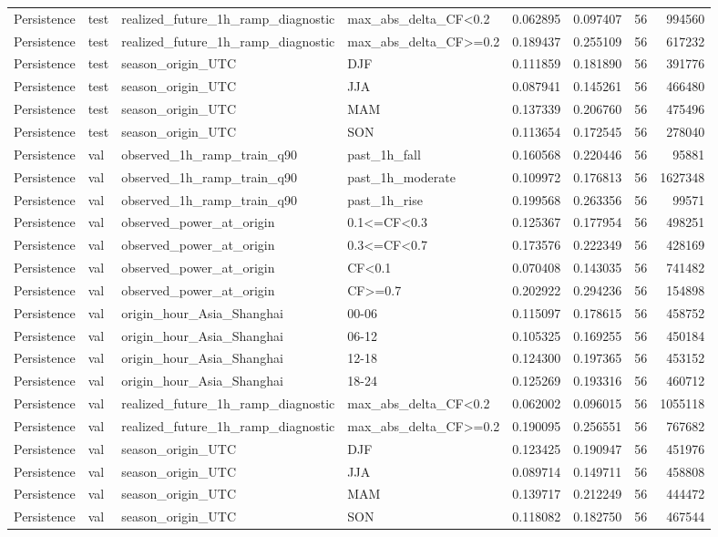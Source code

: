 \begin{tabular}{llllrrrr}
Persistence & test & realized\_future\_1h\_ramp\_diagnostic & max\_abs\_delta\_CF<0.2 & 0.062895 & 0.097407 & 56 & 994560 \\
Persistence & test & realized\_future\_1h\_ramp\_diagnostic & max\_abs\_delta\_CF>=0.2 & 0.189437 & 0.255109 & 56 & 617232 \\
Persistence & test & season\_origin\_UTC & DJF & 0.111859 & 0.181890 & 56 & 391776 \\
Persistence & test & season\_origin\_UTC & JJA & 0.087941 & 0.145261 & 56 & 466480 \\
Persistence & test & season\_origin\_UTC & MAM & 0.137339 & 0.206760 & 56 & 475496 \\
Persistence & test & season\_origin\_UTC & SON & 0.113654 & 0.172545 & 56 & 278040 \\
Persistence & val & observed\_1h\_ramp\_train\_q90 & past\_1h\_fall & 0.160568 & 0.220446 & 56 & 95881 \\
Persistence & val & observed\_1h\_ramp\_train\_q90 & past\_1h\_moderate & 0.109972 & 0.176813 & 56 & 1627348 \\
Persistence & val & observed\_1h\_ramp\_train\_q90 & past\_1h\_rise & 0.199568 & 0.263356 & 56 & 99571 \\
Persistence & val & observed\_power\_at\_origin & 0.1<=CF<0.3 & 0.125367 & 0.177954 & 56 & 498251 \\
Persistence & val & observed\_power\_at\_origin & 0.3<=CF<0.7 & 0.173576 & 0.222349 & 56 & 428169 \\
Persistence & val & observed\_power\_at\_origin & CF<0.1 & 0.070408 & 0.143035 & 56 & 741482 \\
Persistence & val & observed\_power\_at\_origin & CF>=0.7 & 0.202922 & 0.294236 & 56 & 154898 \\
Persistence & val & origin\_hour\_Asia\_Shanghai & 00-06 & 0.115097 & 0.178615 & 56 & 458752 \\
Persistence & val & origin\_hour\_Asia\_Shanghai & 06-12 & 0.105325 & 0.169255 & 56 & 450184 \\
Persistence & val & origin\_hour\_Asia\_Shanghai & 12-18 & 0.124300 & 0.197365 & 56 & 453152 \\
Persistence & val & origin\_hour\_Asia\_Shanghai & 18-24 & 0.125269 & 0.193316 & 56 & 460712 \\
Persistence & val & realized\_future\_1h\_ramp\_diagnostic & max\_abs\_delta\_CF<0.2 & 0.062002 & 0.096015 & 56 & 1055118 \\
Persistence & val & realized\_future\_1h\_ramp\_diagnostic & max\_abs\_delta\_CF>=0.2 & 0.190095 & 0.256551 & 56 & 767682 \\
Persistence & val & season\_origin\_UTC & DJF & 0.123425 & 0.190947 & 56 & 451976 \\
Persistence & val & season\_origin\_UTC & JJA & 0.089714 & 0.149711 & 56 & 458808 \\
Persistence & val & season\_origin\_UTC & MAM & 0.139717 & 0.212249 & 56 & 444472 \\
Persistence & val & season\_origin\_UTC & SON & 0.118082 & 0.182750 & 56 & 467544 \\
\bottomrule
\end{tabular}
